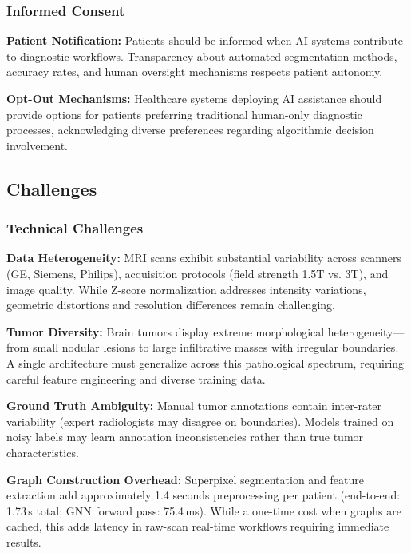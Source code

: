 \documentclass{article}
\begin{document}
\subsubsection{Informed Consent}

\textbf{Patient Notification:} Patients should be informed when AI systems contribute to diagnostic workflows. Transparency about automated segmentation methods, accuracy rates, and human oversight mechanisms respects patient autonomy.

\textbf{Opt-Out Mechanisms:} Healthcare systems deploying AI assistance should provide options for patients preferring traditional human-only diagnostic processes, acknowledging diverse preferences regarding algorithmic decision involvement.


\subsection{Challenges}

\subsubsection{Technical Challenges}

\textbf{Data Heterogeneity:} MRI scans exhibit substantial variability across scanners (GE, Siemens, Philips), acquisition protocols (field strength 1.5T vs. 3T), and image quality. While Z-score normalization addresses intensity variations, geometric distortions and resolution differences remain challenging.

\textbf{Tumor Diversity:} Brain tumors display extreme morphological heterogeneity—from small nodular lesions to large infiltrative masses with irregular boundaries. A single architecture must generalize across this pathological spectrum, requiring careful feature engineering and diverse training data.

\textbf{Ground Truth Ambiguity:} Manual tumor annotations contain inter-rater variability (expert radiologists may disagree on boundaries). Models trained on noisy labels may learn annotation inconsistencies rather than true tumor characteristics.

\textbf{Graph Construction Overhead:} Superpixel segmentation and feature extraction add approximately 1.4 seconds preprocessing per patient (end-to-end: 1.73\,s total; GNN forward pass: 75.4\,ms). While a one-time cost when graphs are cached, this adds latency in raw-scan real-time workflows requiring immediate results.
\end{document}
